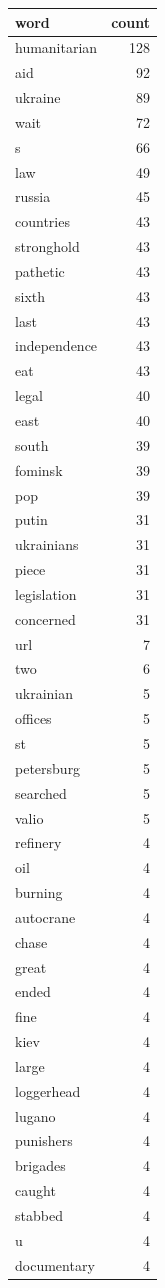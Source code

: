 \begin{tabular}{lr}
\toprule
word & count \\
\midrule
humanitarian & 128 \\
aid & 92 \\
ukraine & 89 \\
wait & 72 \\
s & 66 \\
law & 49 \\
russia & 45 \\
countries & 43 \\
stronghold & 43 \\
pathetic & 43 \\
sixth & 43 \\
last & 43 \\
independence & 43 \\
eat & 43 \\
legal & 40 \\
east & 40 \\
south & 39 \\
fominsk & 39 \\
pop & 39 \\
putin & 31 \\
ukrainians & 31 \\
piece & 31 \\
legislation & 31 \\
concerned & 31 \\
url & 7 \\
two & 6 \\
ukrainian & 5 \\
offices & 5 \\
st & 5 \\
petersburg & 5 \\
searched & 5 \\
valio & 5 \\
refinery & 4 \\
oil & 4 \\
burning & 4 \\
autocrane & 4 \\
chase & 4 \\
great & 4 \\
ended & 4 \\
fine & 4 \\
kiev & 4 \\
large & 4 \\
loggerhead & 4 \\
lugano & 4 \\
punishers & 4 \\
brigades & 4 \\
caught & 4 \\
stabbed & 4 \\
u & 4 \\
documentary & 4 \\
\bottomrule
\end{tabular}
